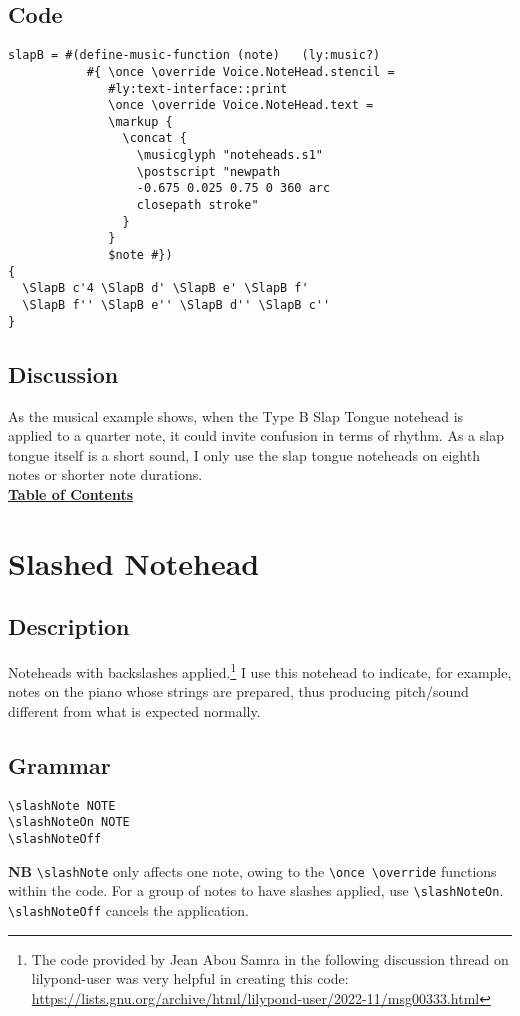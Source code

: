 \documentclass[11pt, oneside]{book}   	%
\begin{document}
\subsection{Code}
\begin{verbatim}
slapB = #(define-music-function (note)   (ly:music?)
           #{ \once \override Voice.NoteHead.stencil =
              #ly:text-interface::print
              \once \override Voice.NoteHead.text =
              \markup {
                \concat {
                  \musicglyph "noteheads.s1"
                  \postscript "newpath 
                  -0.675 0.025 0.75 0 360 arc 
                  closepath stroke"
                }
              }
              $note #})
{
  \SlapB c'4 \SlapB d' \SlapB e' \SlapB f'
  \SlapB f'' \SlapB e'' \SlapB d'' \SlapB c''
}

\end{verbatim}
\subsection{Discussion}
As the musical example shows, when the Type B Slap Tongue notehead is applied to a quarter note, it could invite confusion in terms of rhythm. As a slap tongue itself is a short sound, I only use the slap tongue noteheads on eighth notes or shorter note durations. 
\hyperref[sec:toc]{\\ \textbf{Table of Contents}}

\vfill \break


\section {Slashed Notehead}
\hfill
\subsection{Description}
Noteheads with backslashes applied.\footnote{The code provided by Jean Abou Samra in the following discussion thread on lilypond-user was very helpful in creating this code: \url{https://lists.gnu.org/archive/html/lilypond-user/2022-11/msg00333.html}} I use this notehead to indicate, for example, notes on the piano whose strings are prepared, thus producing pitch/sound different from what is expected normally. 

\subsection{Grammar}
\begin{verbatim}
\slashNote NOTE
\slashNoteOn NOTE
\slashNoteOff 
\end{verbatim}
\textbf{NB} \verb|\slashNote| only affects one note, owing to the \verb|\once \override| functions within the code. For a group of notes to have slashes applied, use \verb|\slashNoteOn|. \verb|\slashNoteOff| cancels the application.
\end{document}
